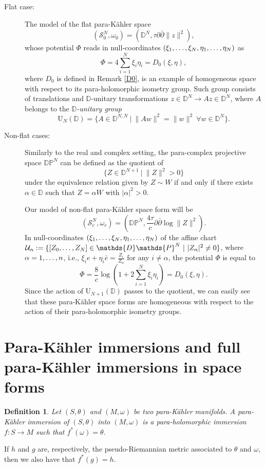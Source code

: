 \documentclass{article}
\newtheorem{df}[thm]{Definition}
\newcommand{\de}{\partial}
\newcommand{\s}{\mathcal{S}}
\newcommand{\pk}{para-K\"ahler }
\newcommand{\D}{\mathds{D}}
\newcommand{\DP}{\mathds{D}\mathds{P}}
\begin{document}
\begin{description}
\item[Flat case:] The model of the flat \pk space
\begin{equation}\label{omega0}
\left(\s_0^N,\omega_0\right)=\left(\D^N,{\tau}\de\bar\de \|z\|^2\right),
\end{equation}
whose potential $\Phi$ reads in null-coordinates $(\xi_1,\mathellipsis, \xi_N,\eta_1,\mathellipsis,\eta_N)$ as 
\begin{equation}\label{dn}
 \Phi=4\sum_{i=1}^N \xi_i\eta_i =D_0(\xi,\eta), \end{equation}
where $D_0$ is defined in Remark \ref{D0},
is an example of homogeneous space with respect to its para-holomorphic isometry group. Such group consists of translations and $\D$-unitary transformations $z\in\D^N\to Az\in \D^N$, where $A$ belongs to the \emph{$\D$-unitary group} $$\mathrm{U}_N(\D)=\{A\in \D^{N,N}\ |\ \|Aw\|^2=\|w\|^2\ \forall w\in\D^N\}.$$
\item[Non-flat cases:]
Similarly to the real and complex setting, the para-complex projective space $\DP^N$ can be defined as the quotient of
$$\{Z\in\D^{N+1} \ |\ \|Z\|^2>0\}$$
under the equivalence relation given by
$Z\sim W$ if and only if there exists $\alpha\in\D$ such that $Z=\alpha W$ with $|\alpha|^2>0$.


Our model of non-flat \pk space form will be
\begin{equation}
(\s_c^N,\omega_c)=\left(\DP^N,\frac{4\tau}{c}\de\bar\de\log \|Z\|^2 \right).
\end{equation}
In null-coordinates  $(\xi_1,\mathellipsis, \xi_N,\eta_1,\mathellipsis,\eta_N)$ of the affine chart $\mathcal{U}_\alpha:=\{[Z_0,\mathellipsis,Z_N]\in \DP^N \ |\ |Z_\alpha|^2\neq 0\}$, where $\alpha=1,\mathellipsis,n$, i.e., $\xi_i e+\eta_i \bar e= \frac{Z_i}{Z_\alpha}$ for any $i\neq \alpha$, the potential $\Phi$ is equal to 
\begin{equation}\label{dpn}
\Phi= \frac{8}{c}\log\left( 1+2\sum_{i=1}^N \xi_i\eta_i\right)=D_0(\xi,\eta). \end{equation}
Since the action of $\mathrm{U}_{N+1}(\D)$ passes to the quotient, we can easily see that these \pk space forms are homogeneous with respect to the action of their para-holomorphic isometry groups.
\end{description}




\section{Para-K\"ahler immersions and full \pk immersions in space forms}\label{fullpk}
\begin{df}
Let  $(S,\theta)$  and $(M,\omega)$ be two \pk manifolds. A \emph{\pk immersion} of $(S,\theta)$ into $(M,\omega)$ is a para-holomorphic immersion $f: S\to M$ such that $f^*(\omega)=\theta$.
\end{df}
If $h$ and $g$ are, respectively, the  pseudo-Riemannian metric associated to $\theta$ and $\omega$, then we also have that $f^*(g)=h$.
\end{document}
